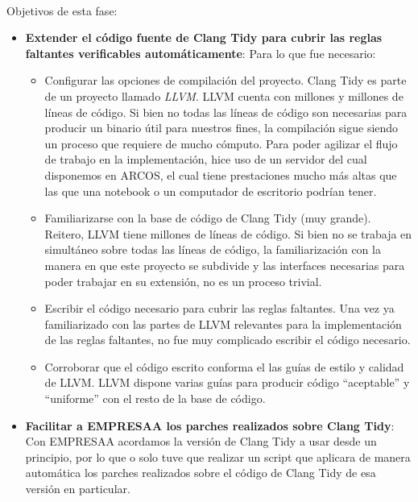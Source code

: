 \documentclass[12pt]{extreport} %
\begin{document}
\paragraph{}
Objetivos de esta fase:
\begin{itemize}
\item \textbf{Extender el código fuente de Clang Tidy para cubrir las
  reglas faltantes verificables automáticamente}: Para lo que fue
  necesario:
  \begin{itemize}
  \item Configurar las opciones de compilación del proyecto. Clang
    Tidy es parte de un proyecto llamado \emph{LLVM}. LLVM cuenta con
    millones y millones de líneas de código. Si bien no todas las
    líneas de código son necesarias para producir un binario útil para
    nuestros fines, la compilación sigue siendo un proceso que
    requiere de mucho cómputo. Para poder agilizar el flujo de trabajo
    en la implementación, hice uso de un servidor del cual disponemos
    en ARCOS, el cual tiene prestaciones mucho más altas que las que
    una notebook o un computador de escritorio podrían tener.
  \item Familiarizarse con la base de código de Clang Tidy (muy
    grande). Reitero, LLVM tiene millones de líneas de código. Si bien
    no se trabaja en simultáneo sobre todas las líneas de código, la
    familiarización con la manera en que este proyecto se subdivide y
    las interfaces necesarias para poder trabajar en su extensión, no
    es un proceso trivial.
  \item Escribir el código necesario para cubrir las reglas
    faltantes. Una vez ya familiarizado con las partes de LLVM
    relevantes para la implementación de las reglas faltantes, no fue
    muy complicado escribir el código necesario.
  \item Corroborar que el código escrito conforma el las guías de
    estilo y calidad de LLVM. LLVM dispone varias guías para producir
    código ``aceptable'' y ``uniforme'' con el resto de la base de
    código.
  \end{itemize}
\item \textbf{Facilitar a EMPRESAA los parches realizados sobre Clang
  Tidy}: Con EMPRESAA acordamos la versión de Clang Tidy a usar desde
  un principio, por lo que o solo tuve que realizar un script que
  aplicara de manera automática los parches realizados sobre el código
  de Clang Tidy de esa versión en particular.
\end{itemize}
\end{document}

